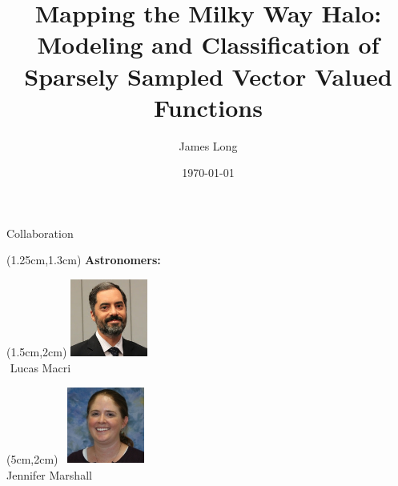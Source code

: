 \documentclass[12pt]{beamer}
\title{Mapping the Milky Way Halo: Modeling and Classification of Sparsely Sampled Vector Valued Functions}
\author{James Long}
\institute{Texas A\&M University}
\date{\today}
\newcommand{\w}{1in}
\newcommand{\h}{1in}
\begin{document}
\frame{\titlepage}

\begin{frame}{Collaboration}


  \begin{textblock*}{3cm}(1.25cm,1.3cm) %
    \textbf{Astronomers:}
  \end{textblock*}
  
  \begin{textblock*}{3cm}(1.5cm,2cm) %
\includegraphics[width=\w,height=\h]{figs/Macri.jpg}\\
$\, \, $Lucas Macri
\end{textblock*}


  \begin{textblock*}{3cm}(5cm,2cm) %
 $\, $ \includegraphics[width=\w,height=\h]{figs/marshall.jpg}\\
Jennifer Marshall
\end{textblock*}


\end{frame}
\end{document}
